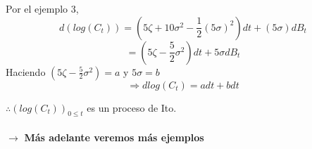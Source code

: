 \documentclass[12pts]{extarticle}
\begin{document}
Por el ejemplo 3, $$d(log(C_t))=(5\zeta +10 \sigma^2-\frac{1}{2}(5\sigma)^2)dt +(5\sigma)dB_t$$ $$=(5\zeta - \frac{5}{2}\sigma^2)dt + 5\sigma dB_t$$
Haciendo $(5\zeta - \frac{5}{2}\sigma^2) = a$ y $ 5\sigma = b$
$$\Rightarrow dlog(C_t)=adt  +b dt $$

$\therefore (log(C_t))_{0 \leq t}$ es un proceso de Ito.  \\ \\

$\rightarrow$ \textbf{Más adelante veremos más ejemplos} 


 
\end{document}
